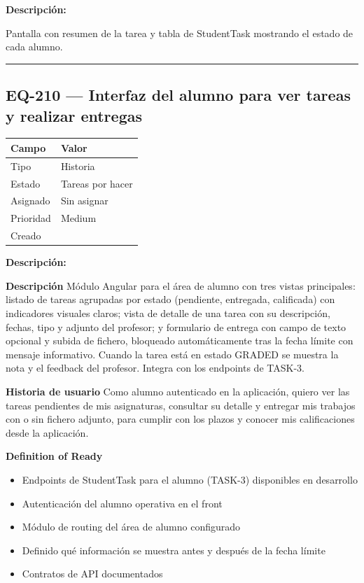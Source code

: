 \documentclass[
  spanish,
  11pt,
]{report}
\newcounter{none} %
\providecommand{\tightlist}{%
  \setlength{\itemsep}{0pt}\setlength{\parskip}{0pt}}
\begin{document}
\textbf{Descripción:}

Pantalla con resumen de la tarea y tabla de StudentTask mostrando el
estado de cada alumno.

\begin{center}\rule{0.5\linewidth}{0.5pt}\end{center}

\subsection{EQ-210 --- Interfaz del alumno para ver tareas y realizar
entregas}\label{eq-210-interfaz-del-alumno-para-ver-tareas-y-realizar-entregas}

{\def\LTcaptype{none} %
\begin{longtable}[]{@{}ll@{}}
\toprule\noalign{}
Campo & Valor \\
\midrule\noalign{}
\endhead
\bottomrule\noalign{}
\endlastfoot
Tipo & Historia \\
Estado & Tareas por hacer \\
Asignado & Sin asignar \\
Prioridad & Medium \\
Creado & \\
\end{longtable}
}

\textbf{Descripción:}

\textbf{Descripción} Módulo Angular para el área de alumno con tres
vistas principales: listado de tareas agrupadas por estado (pendiente,
entregada, calificada) con indicadores visuales claros; vista de detalle
de una tarea con su descripción, fechas, tipo y adjunto del profesor; y
formulario de entrega con campo de texto opcional y subida de fichero,
bloqueado automáticamente tras la fecha límite con mensaje informativo.
Cuando la tarea está en estado GRADED se muestra la nota y el feedback
del profesor. Integra con los endpoints de TASK-3.

\textbf{Historia de usuario} Como alumno autenticado en la aplicación,
quiero ver las tareas pendientes de mis asignaturas, consultar su
detalle y entregar mis trabajos con o sin fichero adjunto, para cumplir
con los plazos y conocer mis calificaciones desde la aplicación.

\textbf{Definition of Ready}

\begin{itemize}
\tightlist
\item
  Endpoints de StudentTask para el alumno (TASK-3) disponibles en
  desarrollo
\item
  Autenticación del alumno operativa en el front
\item
  Módulo de routing del área de alumno configurado
\item
  Definido qué información se muestra antes y después de la fecha límite
\item
  Contratos de API documentados
\end{itemize}
\end{document}
